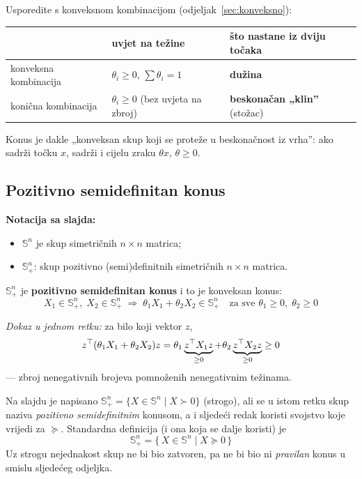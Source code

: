 \begin{napomena}
Usporedite s konveksnom kombinacijom (odjeljak~\ref{sec:konveksno}):
\begin{center}
\begin{tabular}{lll}
\toprule
& \textbf{uvjet na težine} & \textbf{što nastane iz dviju točaka} \\
\midrule
konveksna kombinacija & $\theta_i \ge 0$, $\sum\theta_i = 1$ & \textbf{dužina} \\
konična kombinacija & $\theta_i \ge 0$ (bez uvjeta na zbroj)
  & \textbf{beskonačan „klin”} (stožac) \\
\bottomrule
\end{tabular}
\end{center}
Konus je dakle „konveksan skup koji se proteže u beskonačnost iz vrha”: ako
sadrži točku $x$, sadrži i cijelu zraku $\theta x$, $\theta \ge 0$.
\end{napomena}

\subsection{Pozitivno semidefinitan konus}

\textbf{Notacija sa slajda:}
\begin{itemize}
  \item $\mathbb{S}^n$ je skup simetričnih $n\times n$ matrica;
  \item $\mathbb{S}^n_+$: skup pozitivno (semi)definitnih simetričnih
        $n\times n$ matrica.
\end{itemize}

$\mathbb{S}^n_+$ je \textbf{pozitivno semidefinitan konus} i to je konveksan
konus:
\[
X_1 \in \mathbb{S}^n_+,\; X_2 \in \mathbb{S}^n_+
\;\Longrightarrow\;
\theta_1X_1 + \theta_2X_2 \in \mathbb{S}^n_+
\quad\text{za sve } \theta_1 \ge 0,\; \theta_2 \ge 0
\]

\emph{Dokaz u jednom retku:} za bilo koji vektor $z$,
\[
z^{\top}(\theta_1X_1 + \theta_2X_2)z
= \theta_1\underbrace{z^{\top} X_1z}_{\ge0}
+ \theta_2\underbrace{z^{\top} X_2z}_{\ge0} \ge 0
\]
--- zbroj nenegativnih brojeva pomnoženih nenegativnim težinama. \checkmark

\begin{napomena}
Na slajdu je napisano
$\mathbb{S}^n_+ = \{X \in \mathbb{S}^n \mid X \succ 0\}$ (strogo), ali se u
istom retku skup naziva \emph{pozitivno semidefinitnim} konusom, a i sljedeći
redak koristi svojstvo koje vrijedi za $\succeq$. Standardna definicija (i ona
koja se dalje koristi) je
\[
\mathbb{S}^n_+ = \{\, X \in \mathbb{S}^n \mid X \succeq 0 \,\}
\]
Uz strogu nejednakost skup ne bi bio zatvoren, pa ne bi bio ni \emph{pravilan}
konus u smislu sljedećeg odjeljka.
\end{napomena}

